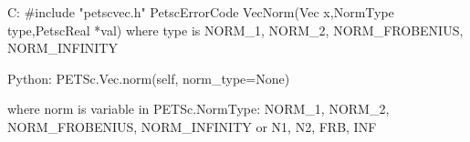 C:
#include "petscvec.h"
PetscErrorCode  VecNorm(Vec x,NormType type,PetscReal *val)
where type is
    NORM_1, NORM_2, NORM_FROBENIUS, NORM_INFINITY

Python:
PETSc.Vec.norm(self, norm_type=None)

where norm is variable in PETSc.NormType:
    NORM_1, NORM_2, NORM_FROBENIUS, NORM_INFINITY or
    N1, N2, FRB, INF
